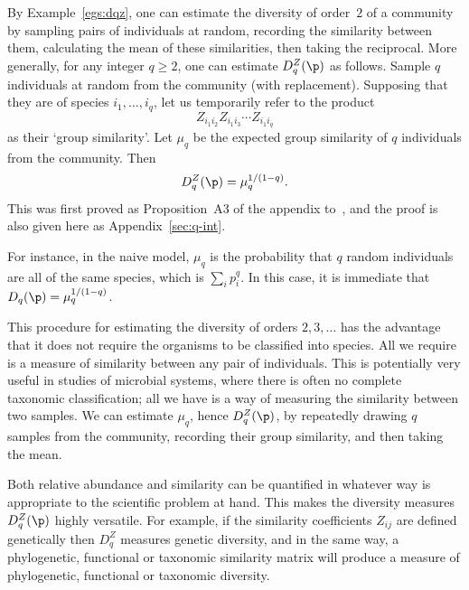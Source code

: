 \begin{example}
% 
By Example~\ref{egs:dqz}, one can estimate the diversity
of order~$2$ of a community by sampling pairs of individuals at random,
recording the similarity between them, calculating the mean of these
similarities, then taking the reciprocal.  More generally, for any integer%
%
%
%
$q \geq 2$, one can estimate $D_q^Z(\p)$ as follows.  Sample $q$
individuals at random from the community (with replacement).  Supposing
that they are of species $i_1, \ldots, i_q$, let us temporarily refer to
the product
\[
Z_{i_1 i_2} Z_{i_1 i_3} \cdots Z_{i_1 i_q}
\]
as their `group%
%
%
similarity'.  Let $\mu_q$ be the expected group similarity of $q$
individuals from the community.  Then
\[
D_q^Z(\p) = \mu_q^{1/(1 - q)}.
\]
This was first proved as Proposition~A3 of the appendix to~\cite{MDISS},
and the proof is also given here as Appendix~\ref{sec:q-int}.

For instance, in the naive model,%
%
%
$\mu_q$ is the probability that $q$ random individuals are all of the
same species, which is $\sum_i p_i^q$.  In this case, it is immediate that
$D_q(\p) = \mu_q^{1/(1 - q)}$.

This procedure for estimating the diversity of orders $2, 3, \ldots$ has
the advantage that it does not require the organisms to be classified into
species.  All we require is a measure of similarity between any pair of
individuals.  This is potentially very useful in studies of microbial%
%
%
systems, where there is often no complete taxonomic classification; all we
have is a way of measuring the similarity between two samples.  We can
estimate $\mu_q$, hence $D_q^Z(\p)$, by repeatedly drawing $q$ samples from
the community, recording their group similarity, and then taking the mean.
\end{example}

Both relative abundance and similarity can be quantified in whatever way is
appropriate to the scientific problem at hand.  
This
makes the diversity measures $D_q^Z(\p)$ highly versatile.  For example, if
the similarity coefficients $Z_{ij}$ are defined genetically then $D_q^Z$
measures genetic diversity,%
% 
%
%  
and in the same way, a phylogenetic,%
% 
%
% 
functional%
% 
%
% 
or taxonomic%
% 
%
% 
similarity matrix will produce a measure of phylogenetic,
functional or taxonomic diversity.

